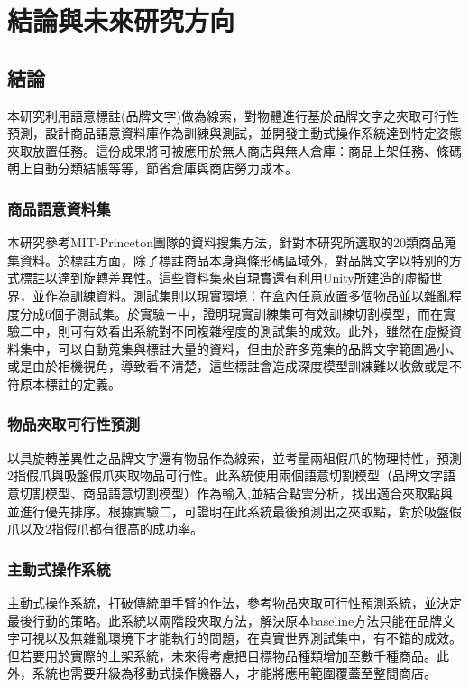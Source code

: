\chapter{結論與未來研究方向}
\label{chapter:conclusions}

\section{結論}
本研究利用語意標註(品牌文字)做為線索，對物體進行基於品牌文字之夾取可行性預測，設計商品語意資料庫作為訓練與測試，並開發主動式操作系統達到特定姿態夾取放置任務。這份成果將可被應用於無人商店與無人倉庫：商品上架任務、條碼朝上自動分類結帳等等，節省倉庫與商店勞力成本。

\subsection{商品語意資料集}
本研究參考MIT-Princeton團隊的資料搜集方法，針對本研究所選取的20類商品蒐集資料。於標註方面，除了標註商品本身與條形碼區域外，對品牌文字以特別的方式標註以達到旋轉差異性。這些資料集來自現實還有利用Unity所建造的虛擬世界，並作為訓練資料。測試集則以現實環境：在盒內任意放置多個物品並以雜亂程度分成6個子測試集。於實驗ㄧ中，證明現實訓練集可有效訓練切割模型，而在實驗二中，則可有效看出系統對不同複雜程度的測試集的成效。此外，雖然在虛擬資料集中，可以自動蒐集與標註大量的資料，但由於許多蒐集的品牌文字範圍過小、或是由於相機視角，導致看不清楚，這些標註會造成深度模型訓練難以收斂或是不符原本標註的定義。

\subsection{物品夾取可行性預測}
以具旋轉差異性之品牌文字還有物品作為線索，並考量兩組假爪的物理特性，預測2指假爪與吸盤假爪夾取物品可行性。此系統使用兩個語意切割模型（品牌文字語意切割模型、商品語意切割模型）作為輸入,並結合點雲分析，找出適合夾取點與並進行優先排序。根據實驗二，可證明在此系統最後預測出之夾取點，對於吸盤假爪以及2指假爪都有很高的成功率。

\subsection{主動式操作系統}
主動式操作系統，打破傳統單手臂的作法，參考物品夾取可行性預測系統，並決定最後行動的策略。此系統以兩階段夾取方法，解決原本baseline方法只能在品牌文字可視以及無雜亂環境下才能執行的問題，在真實世界測試集中，有不錯的成效。但若要用於實際的上架系統，未來得考慮把目標物品種類增加至數千種商品。此外，系統也需要升級為移動式操作機器人，才能將應用範圍覆蓋至整間商店。

